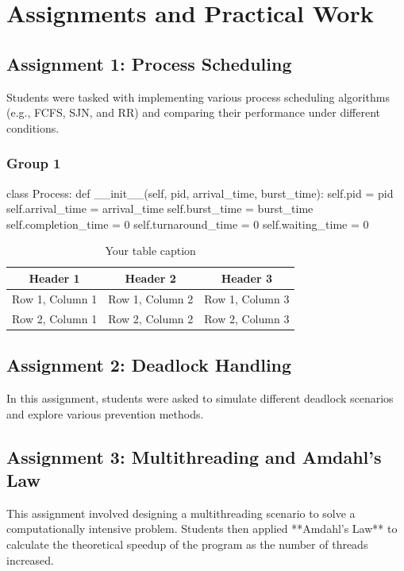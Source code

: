 \documentclass[12pt]{article}
\begin{document}
\section{Assignments and Practical Work}
\subsection{Assignment 1: Process Scheduling}
Students were tasked with implementing various process scheduling algorithms (e.g., FCFS, SJN, and RR) and comparing their performance under different conditions.
\subsubsection{Group 1}
\begin{python}
    class Process:
    def __init__(self, pid, arrival_time, burst_time):
        self.pid = pid
        self.arrival_time = arrival_time
        self.burst_time = burst_time
        self.completion_time = 0
        self.turnaround_time = 0
        self.waiting_time = 0
\end{python}

\begin{table}[htbp] %
    \centering
    \begin{tabular}{|c|c|c|} %
    \hline
    Header 1 & Header 2 & Header 3 \\ %
    \hline
    Row 1, Column 1 & Row 1, Column 2 & Row 1, Column 3 \\ %
    \hline
    Row 2, Column 1 & Row 2, Column 2 & Row 2, Column 3 \\ %
    \hline
    \end{tabular}
    \caption{Your table caption} %
    \label{tab:your_label} %
\end{table}
\subsection{Assignment 2: Deadlock Handling}
In this assignment, students were asked to simulate different deadlock scenarios and explore various prevention methods.

\subsection{Assignment 3: Multithreading and Amdahl's Law}
This assignment involved designing a multithreading scenario to solve a computationally intensive problem. Students then applied **Amdahl's Law** to calculate the theoretical speedup of the program as the number of threads increased.
\end{document}
